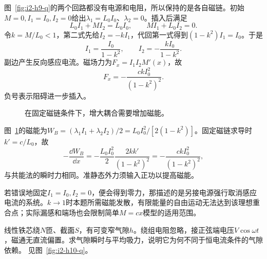 \begin{solution}
图~\ref{fig:i2-h9-q}的两个回路都没有电源和电阻，所以保持的是各自磁链。初始$M=0,I_1=I_0,I_2=0$给出$\lambda_1=L_0I_0$、$\lambda_2=0$。插入后满足
\[L_0I_1+MI_2=L_0I_0,\qquad MI_1+L_0I_2=0.
\]
令$k=M/L_0<1$，第二式先给$I_2=-kI_1$，代回第一式得到$(1-k^2)I_1=I_0$。于是
\[\boxed{I_1=\frac{I_0}{1-k^2},\qquad
I_2=-\frac{kI_0}{1-k^2}}.
\]
副边产生反向感应电流。磁场力为$F_x=I_1I_2M'(x)$，故
\[\boxed{F_x=-\frac{ckI_0^2}{(1-k^2)^2}}.
\]
负号表示阻碍进一步插入。


\begin{figure}[H]\centering
{}
\caption{在固定磁链条件下，增大耦合需要增加磁能。}\label{fig:i2-h9-s}
\end{figure}

图~\ref{fig:i2-h9-s}的磁能为$W_B=(\lambda_1I_1+\lambda_2I_2)/2=L_0I_0^2/[2(1-k^2)]$。固定磁链求导时$k'=c/L_0$，故
\[-\frac{\dd W_B}{\dd x}=-\frac{L_0I_0^2}2
\frac{2kk'}{(1-k^2)^2}=-\frac{ckI_0^2}{(1-k^2)^2},\]
与共能法的瞬时力相同。准静态外力须输入正功以提高磁能。

若错误地固定$I_1=I_0,I_2=0$，便会得到零力，那描述的是另接电源强行取消感应电流的系统。$k\to1$时本题所需磁能发散，有限能量的自由运动无法达到该理想重合点；实际漏感和端场也会限制简单$M=cx$模型的适用范围。
\end{solution}

\begin{exercise}[交流恒电压下的气隙吸力]\label{ex:i2-h10}
线性铁芯绕$N$匝、截面$S$，有可变窄气隙$h$。绕组电阻忽略，接正弦端电压$\widehat V\cos\omega t$，磁通无直流偏置。求气隙瞬时与平均吸力，说明它为何不同于恒电流条件的气隙依赖。 见图~\ref{fig:i2-h10-q}。
\end{exercise}

